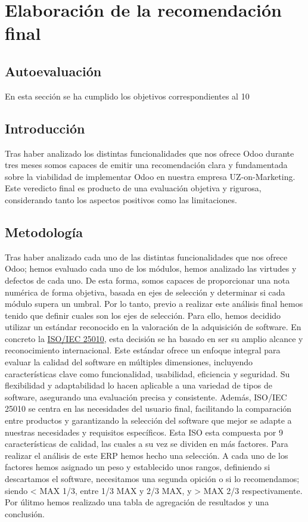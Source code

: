 \section{Elaboración de la recomendación final}
\subsection{Autoevaluación}
En esta sección se ha cumplido los objetivos correspondientes al 10
\subsection{Introducción}
Tras haber analizado los distintas funcionalidades que nos ofrece Odoo durante tres meses somos capaces de emitir una recomendación clara y fundamentada sobre la viabilidad de implementar Odoo en nuestra empresa UZ-on-Marketing. Este veredicto final es producto de una evaluación objetiva y rigurosa, considerando tanto los aspectos positivos como las limitaciones.
\subsection{Metodología}
Tras haber analizado cada uno de las distintas funcionalidades que nos ofrece Odoo; hemos evaluado cada uno de los módulos, hemos analizado las virtudes y defectos de cada uno. De esta forma, somos capaces de proporcionar una nota numérica de forma objetiva, basada en ejes de selección y determinar si cada módulo supera un umbral. Por lo tanto, previo a realizar este análisis final hemos tenido que definir cuales son los ejes de selección. Para ello, hemos decidido utilizar un estándar reconocido en la valoración de la adquisición de software. En concreto la \href{https://iso25000.com/index.php/normas-iso-25000/iso-25010}{ISO/IEC 25010}, esta decisión se ha basado en ser su amplio alcance y reconocimiento internacional. Este estándar ofrece un enfoque integral para evaluar la calidad del software en múltiples dimensiones, incluyendo características clave como funcionalidad, usabilidad, eficiencia y seguridad. Su flexibilidad y adaptabilidad lo hacen aplicable a una variedad de tipos de software, asegurando una evaluación precisa y consistente. Además, ISO/IEC 25010 se centra en las necesidades del usuario final, facilitando la comparación entre productos y garantizando la selección del software que mejor se adapte a nuestras necesidades y requisitos específicos. Esta ISO esta compuesta por 9 características de calidad, las cuales a su vez se dividen en más factores. Para realizar el análisis de este ERP hemos hecho una selección. A cada uno de los factores hemos asignado un peso y establecido unos rangos, definiendo si descartamos el software, necesitamos una segunda opición o si lo recomendamos; siendo \textless{} MAX 1/3, entre 1/3 MAX y 2/3 MAX, y \textgreater{} MAX 2/3 respectivamente. Por úlitmo hemos realizado una tabla de agregación de resultados y una conclusión.


